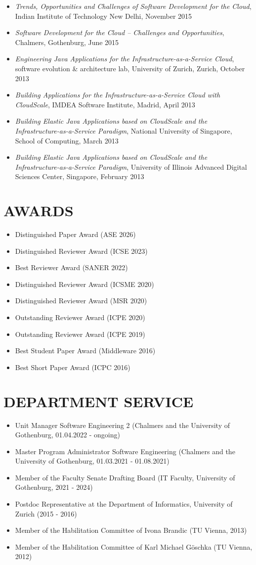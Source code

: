 \documentclass[paper=letter,fontsize=11pt]{scrartcl} %
\newcommand{\NewPart}[2]{\section*{\uppercase{#1} #2}}
\begin{document}
\begin{itemize}
\item \emph{Trends, Opportunities and Challenges of Software Development for the Cloud}, Indian Institute of Technology New Delhi, November 2015
\item \emph{Software Development for the Cloud -- Challenges and Opportunities}, Chalmers, Gothenburg, June 2015
\item \emph{Engineering Java Applications for the Infrastructure-as-a-Service Cloud}, software evolution \& architecture lab, University of Zurich, Zurich, October 2013
\item \emph{Building Applications for the Infrastructure-as-a-Service Cloud with CloudScale}, IMDEA Software Institute, Madrid, April 2013
\item \emph{Building Elastic Java Applications based on CloudScale and the Infrastructure-as-a-Service Paradigm}, National University of Singapore, School of Computing, March 2013
\item \emph{Building Elastic Java Applications based on CloudScale and the Infrastructure-as-a-Service Paradigm}, University of Illinois Advanced Digital Sciences Center, Singapore, February 2013
\end{itemize}

\NewPart{Awards}{}
\begin{itemize}
\item Distinguished Paper Award (ASE 2026)
\item Distinguished Reviewer Award (ICSE 2023)  
\item Best Reviewer Award (SANER 2022)  
\item Distinguished Reviewer Award (ICSME 2020)  
\item Distinguished Reviewer Award (MSR 2020)
\item Outstanding Reviewer Award (ICPE 2020)
\item Outstanding Reviewer Award (ICPE 2019)
\item Best Student Paper Award (Middleware 2016)
\item Best Short Paper Award (ICPC 2016)
\end{itemize}


\NewPart{Department Service}{}
\begin{itemize}
\item Unit Manager Software Engineering 2 (Chalmers and the University of Gothenburg, 01.04.2022 - ongoing)  
\item Master Program Administrator Software Engineering (Chalmers and the University of Gothenburg, 01.03.2021 - 01.08.2021)
\item Member of the Faculty Senate Drafting Board (IT Faculty, University of Gothenburg, 2021 - 2024)
\item Postdoc Representative at the Department of Informatics, University of Zurich (2015 - 2016)
\item Member of the Habilitation Committee of Ivona Brandic (TU Vienna, 2013)
\item Member of the Habilitation Committee of Karl Michael G\"oschka (TU Vienna, 2012)
\end{itemize}
\end{document}

